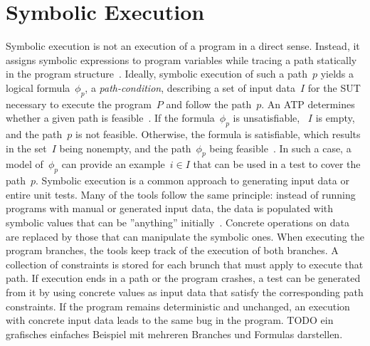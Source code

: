 \documentclass[paper=a4,%
  twoside,%
  BCOR4mm,%
  abstract=true,%
  toc=bibliography,%
  chapterprefix=true,%
  toc=bibliographynumbered,%
  open=right,%
  english,%
  pagesize=pdftex]{scrreprt}
\begin{document}
\section{Symbolic Execution}
Symbolic execution is not an execution of a program in a direct sense. Instead, it assigns symbolic expressions to program variables while tracing a path statically in the program structure~\cite{McMinn_2004}. Ideally, symbolic execution of such a path~$p$ yields a logical formula~$\phi_{p}$, a \textit{path-condition}, describing a set of input data~$I$ for the \ac{SUT} necessary to execute the program~$P$ and follow the path~$p$. An \ac{ATP} determines whether a given path is feasible~\cite{Clarke1976,King1976}. If the formula~$\phi_{p}$ is unsatisfiable, ~$I$ is empty, and the path~$p$ is not feasible. Otherwise, the formula is satisfiable, which results in the set~$I$ being nonempty, and the path~$\phi_{p}$ being feasible~\cite{Ball2015}. In such a case, a model of~$\phi_{p}$ can provide an example~$i \in I$ that can be used in a test to cover the path~$p$. Symbolic execution is a common approach to generating input data or entire unit tests. Many of the tools follow the same principle: instead of running programs with manual or generated input data, the data is populated with symbolic values that can be ''anything'' initially~\cite{cadar2008klee}. Concrete operations on data are replaced by those that can manipulate the symbolic ones. When executing the program branches, the tools keep track of the execution of both branches. A collection of constraints is stored for each brunch that must apply to execute that path. If execution ends in a path or the program crashes, a test can be generated from it by using concrete values as input data that satisfy the corresponding path constraints. If the program remains deterministic and unchanged, an execution with concrete input data leads to the same bug in the program. TODO ein grafisches einfaches Beispiel mit mehreren Branches und Formulas darstellen.
\end{document}
